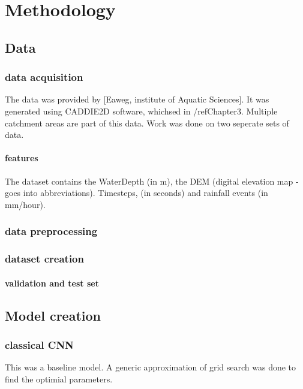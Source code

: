 
\chapter{Methodology} %
\label{Chapter4} %

\section{Data}
\subsection{data acquisition}
The data was provided by [Eaweg, institute of Aquatic Sciences]. It was generated using CADDIE2D software, whichsed in /ref{Chapter3}. Multiple catchment areas are part of this data. Work was done on two seperate sets of data.
\subsubsection{features}
The dataset contains the WaterDepth (in m), the DEM (digital elevation map - goes into abbreviations). Timesteps, (in seconds) and rainfall events (in mm/hour).
\subsection{data preprocessing}

\subsection{dataset creation}

\subsubsection{validation and test set}

\section{Model creation}
\subsection{classical CNN}
This was a baseline model. A generic approximation of grid search was done to find the optimial parameters.
